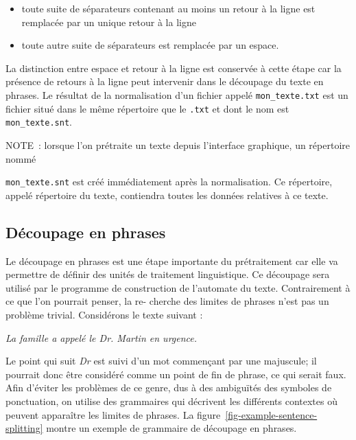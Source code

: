 \begin{itemize}
  \item toute suite de séparateurs contenant au moins un retour à la ligne est remplacée par
  un unique retour à la ligne
  \item toute autre suite de séparateurs est remplacée par un espace.
\end{itemize}

\bigskip
\noindent 
La distinction entre espace et retour à la ligne est conservée à cette étape car la présence
de retours à la ligne peut intervenir dans le découpage du texte en phrases. Le résultat de
la normalisation d’un fichier appelé \verb+mon_texte.txt+ est un fichier situé dans le même
répertoire que le \verb+.txt+ et dont le nom est \verb+mon_texte.snt+. 

\bigskip
\noindent NOTE~: lorsque l’on prétraite un texte depuis l’interface graphique, un répertoire nommé

\noindent \verb+mon_texte.snt+ est créé immédiatement après la normalisation. Ce répertoire, appelé
répertoire du texte, 
 contiendra toutes les données relatives à ce texte.



\subsection{Découpage en phrases}
\label{section-sentence-splitting}
Le découpage en phrases est une étape importante du prétraitement car elle va permettre
de définir des unités de traitement linguistique. Ce découpage sera utilisé par le programme
de construction de l’automate du texte. Contrairement à ce que l’on pourrait penser, la re-
cherche des limites de phrases n’est pas un problème trivial. Considérons le texte suivant :


\bigskip
\textit{La famille a appelé le Dr. Martin en urgence.}

\bigskip \noindent Le point qui suit \textit{Dr} est suivi d’un mot commençant par une majuscule;
il pourrait donc être considéré comme un point de fin de phrase, ce qui serait faux. Afin d’éviter
les problèmes de ce genre, dus à des ambiguïtés des symboles de ponctuation, on utilise des
grammaires qui décrivent les différents contextes où peuvent apparaître les limites de phrases.
La figure~\ref{fig-example-sentence-splitting} montre un exemple de grammaire de découpage en
phrases.

